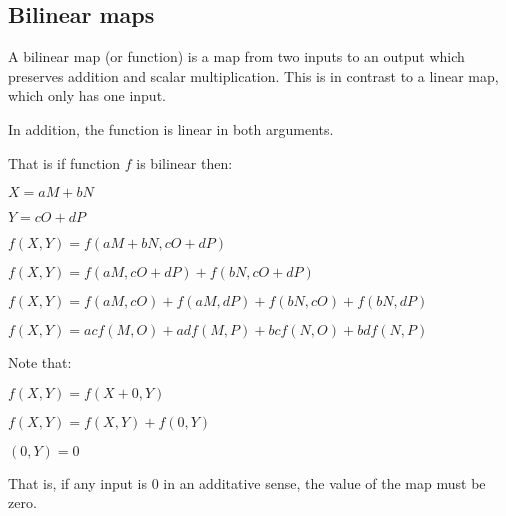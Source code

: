 
\subsection{Bilinear maps}

A bilinear map (or function) is a map from two inputs to an output which preserves addition and scalar multiplication. This is in contrast to a linear map, which only has one input.

In addition, the function is linear in both arguments.

That is if function \(f\) is bilinear then:

\(X=aM+bN\)

\(Y=cO+dP\)

\(f(X,Y)=f(aM+bN,cO+dP)\)

\(f(X,Y)=f(aM,cO+dP)+f(bN,cO+dP)\)

\(f(X,Y)=f(aM,cO)+f(aM,dP)+f(bN,cO)+f(bN,dP)\)

\(f(X,Y)=acf(M,O)+adf(M,P)+bcf(N,O)+bdf(N,P)\)

Note that:

\(f(X,Y)=f(X+0,Y)\)

\(f(X,Y)=f(X,Y)+f(0,Y)\)

\((0,Y)=0\)

That is, if any input is \(0\) in an additative sense, the value of the map must be zero.

